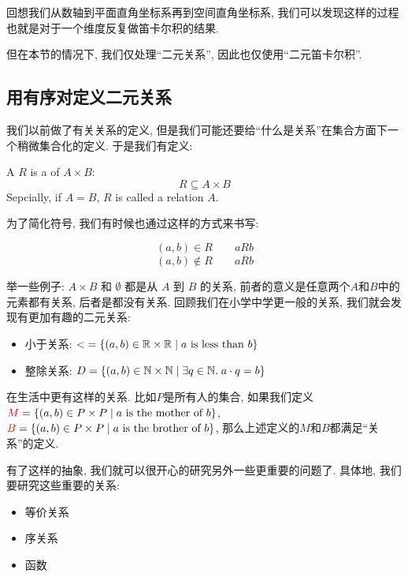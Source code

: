 回想我们从数轴到平面直角坐标系再到空间直角坐标系, 我们可以发现这样的过程也就是对于一个维度反复做笛卡尔积的结果. 

但在本节的情况下, 我们仅处理``二元关系'', 因此也仅使用``二元笛卡尔积''. 


\subsection{用有序对定义二元关系}

我们以前做了有关关系的定义, 但是我们可能还要给``什么是关系''在集合方面下一个稍微集合化的定义. 于是我们有定义: 
\begin{definition}[关系 (Relations)]
  A  $R$ 
  is a  of $A \times B$:
  \[
    {R \subseteq A \times B}
  \]
  Sepcially, if $A = B$, $R$ is called a relation  $A$.
\end{definition}

为了简化符号, 我们有时候也通过这样的方式来书写: 

\begin{definition}[Notations]
  \[
    (a, b) \in R \qquad a R b
  \]
  \[
    (a, b) \notin R \qquad a \overline{R} b
  \]
\end{definition}

举一些例子: $A\times B$ 和 $\emptyset$ 都是从 $A$ 到 $B$ 的关系, 前者的意义是任意两个$A$和$B$中的元素都有关系, 后者是都没有关系. 回顾我们在小学中学更一般的关系, 我们就会发现有更加有趣的二元关系: 
\begin{itemize}
  \item 小于关系: $<\; = \{(a, b) \in \mathbb{R} \times \mathbb{R} \mid a \text{ is less than } b\}$
  \item 整除关系: $D = \{(a, b) \in \mathbb{N} \times \mathbb{N} \mid \exists q \in \mathbb{N}.\; a \cdot q = b\}$
\end{itemize}

在生活中更有这样的关系. 比如$P$是所有人的集合, 如果我们定义$\textcolor{red}{M} = \{(a, b) \in P \times P \mid a \text{ is the mother of } b\}$, $\textcolor{red}{B} = \{(a, b) \in P \times P \mid a \text{ is the brother of } b\}$, 那么上述定义的$M$和$B$都满足``关系''的定义.

有了这样的抽象, 我们就可以很开心的研究另外一些更重要的问题了. 具体地, 我们要研究这些重要的关系: 
\begin{itemize}
  \item 等价关系
  \item 序关系
  \item 函数
\end{itemize}


